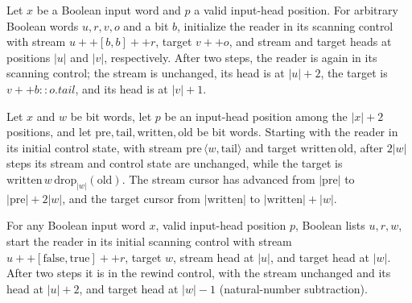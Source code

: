 \begin{lemma}
\label{Complexity.clRead_pair}
\leanok
{}
Let $x$ be a Boolean input word and $p$ a valid input-head position. For arbitrary
Boolean words $u,r,v,o$ and a bit $b$, initialize the reader in its scanning control
with stream $u ++ [b,b] ++ r$, target $v ++ o$, and stream and target heads at positions
$|u|$ and $|v|$, respectively. After two steps, the reader is again in its scanning
control; the stream is unchanged, its head is at $|u|+2$, the target is $v ++ b ::
o.tail$, and its head is at $|v|+1$.
\end{lemma}

\begin{lemma}
\label{Complexity.clRead_forward}
\leanok
{}
Let $x$ and $w$ be bit words, let $p$ be an input-head position among the $|x|+2$
positions, and let $\mathrm{pre},\mathrm{tail},\mathrm{written},\mathrm{old}$ be bit
words. Starting with the reader in its initial control state, with stream
$\mathrm{pre}\,\langle w,\mathrm{tail}\rangle$ and target
$\mathrm{written}\,\mathrm{old}$, after $2|w|$ steps its stream and control state are
unchanged, while the target is $\mathrm{written}\,w\,\mathrm{drop}_{|w|}(\mathrm{old})$.
The stream cursor has advanced from $|\mathrm{pre}|$ to $|\mathrm{pre}|+2|w|$, and the
target cursor from $|\mathrm{written}|$ to $|\mathrm{written}|+|w|$.
\end{lemma}

\begin{lemma}
\label{Complexity.clRead_separator}
\leanok
{}
For any Boolean input word $x$, valid input-head position $p$, Boolean lists $u,r,w$,
start the reader in its initial scanning control with stream $u ++
[\mathrm{false},\mathrm{true}] ++ r$, target $w$, stream head at $|u|$, and target head
at $|w|$. After two steps it is in the rewind control, with the stream unchanged and its
head at $|u|+2$, and target head at $|w|-1$ (natural-number subtraction).
\end{lemma}


